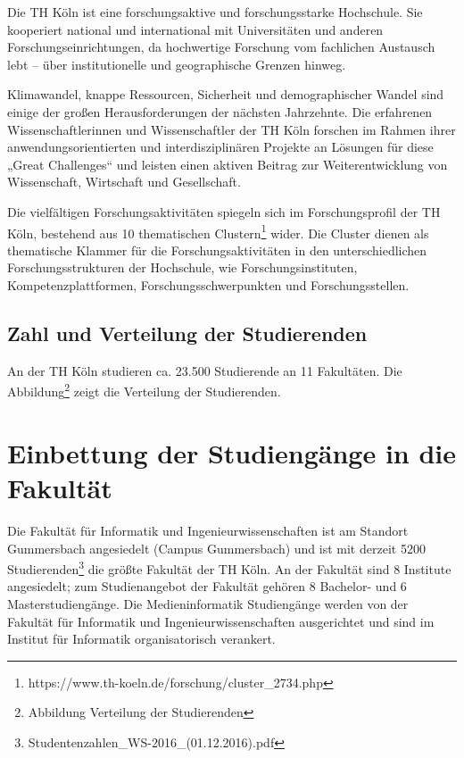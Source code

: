 Die TH Köln ist eine forschungsaktive und forschungsstarke Hochschule.
Sie kooperiert national und international mit Universitäten und anderen
Forschungseinrichtungen, da hochwertige Forschung vom fachlichen
Austausch lebt -- über institutionelle und geographische Grenzen hinweg.

Klimawandel, knappe Ressourcen, Sicherheit und demographischer Wandel
sind einige der großen Herausforderungen der nächsten Jahrzehnte. Die
erfahrenen Wissenschaftlerinnen und Wissenschaftler der TH Köln forschen
im Rahmen ihrer anwendungsorientierten und interdisziplinären Projekte
an Lösungen für diese „Great Challenges`` und leisten einen aktiven
Beitrag zur Weiterentwicklung von Wissenschaft, Wirtschaft und
Gesellschaft.

Die vielfältigen Forschungsaktivitäten spiegeln sich im Forschungsprofil
der TH Köln, bestehend aus 10 thematischen Clustern\footnote{https://www.th-koeln.de/forschung/cluster\_2734.php}
wider. Die Cluster dienen als thematische Klammer für die
Forschungsaktivitäten in den unterschiedlichen Forschungsstrukturen der
Hochschule, wie Forschungsinstituten, Kompetenzplattformen,
Forschungsschwerpunkten und Forschungsstellen.

\subsection{Zahl und Verteilung der
Studierenden}\label{zahl-und-verteilung-der-studierenden}

An der TH Köln studieren ca. 23.500 Studierende an 11 Fakultäten. Die
Abbildung\footnote{Abbildung Verteilung der Studierenden} zeigt die
Verteilung der Studierenden.

\section{Einbettung der Studiengänge in die
Fakultät}\label{einbettung-der-studienguxe4nge-in-die-fakultuxe4t}

Die Fakultät für Informatik und Ingenieurwissenschaften ist am Standort
Gummersbach angesiedelt (Campus Gummersbach) und ist mit derzeit 5200
Studierenden\footnote{Studentenzahlen\_WS-2016\_(01.12.2016).pdf} die
größte Fakultät der TH Köln. An der Fakultät sind 8 Institute
angesiedelt; zum Studienangebot der Fakultät gehören 8 Bachelor- und 6
Masterstudiengänge. Die Medieninformatik Studiengänge werden von der
Fakultät für Informatik und Ingenieurwissenschaften ausgerichtet und
sind im Institut für Informatik organisatorisch verankert.

